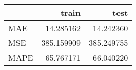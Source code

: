 \begin{tabular}{lrr}
\toprule
{} &       train &        test \\
\midrule
MAE  &   14.285162 &   14.242360 \\
MSE  &  385.159909 &  385.249755 \\
MAPE &   65.767171 &   66.040220 \\
\bottomrule
\end{tabular}
